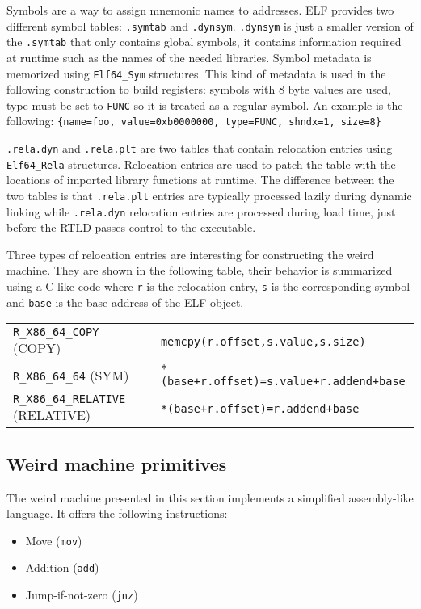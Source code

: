 \documentclass[11pt,twoside,a4paper]{article}
\begin{document}
Symbols are a way to assign mnemonic names to addresses. ELF provides two different symbol tables: \texttt{.symtab} and \texttt{.dynsym}. \texttt{.dynsym} is just a smaller version of the \texttt{.symtab} that only contains global symbols, it contains information required at runtime such as the names of the needed libraries. Symbol metadata is memorized using \texttt{Elf64\_Sym} structures. This kind of metadata is used in the following construction to build registers: symbols with 8 byte values are used, type must be set to \texttt{FUNC} so it is treated as a regular symbol. An example is the following:
\texttt{\{name=foo, value=0xb0000000, type=FUNC, shndx=1, size=8\}}

\texttt{.rela.dyn} and \texttt{.rela.plt} are two tables that contain relocation entries using \texttt{Elf64\_Rela} structures. Relocation entries are used to patch the table with the locations of imported library functions at runtime. The difference between the two tables is that \texttt{.rela.plt} entries are typically processed lazily during dynamic linking while \texttt{.rela.dyn} relocation entries are processed during load time, just before the RTLD passes control to the executable.

Three types of relocation entries are interesting for constructing the weird machine. They are shown in the following table, their behavior is summarized using a C-like code where \texttt{r} is the relocation entry, \texttt{s} is the corresponding symbol and \texttt{base} is the base address of the ELF object.

\begin{tabular}{ l | l }
  \hline
  \texttt{R\_X86\_64\_COPY} (COPY) & \texttt{memcpy(r.offset,s.value,s.size)} \\
  \texttt{R\_X86\_64\_64} (SYM) & \texttt{*(base+r.offset)=s.value+r.addend+base} \\
  \texttt{R\_X86\_64\_RELATIVE} (RELATIVE) & \texttt{*(base+r.offset)=r.addend+base} \\
  \hline
\end{tabular}


\subsection{Weird machine primitives}

The weird machine presented in this section implements a simplified assembly-like language. It offers the following instructions:
\begin{itemize}
\item Move (\texttt{mov})
\item Addition (\texttt{add})
\item Jump-if-not-zero (\texttt{jnz})
\end{itemize}
\end{document}

